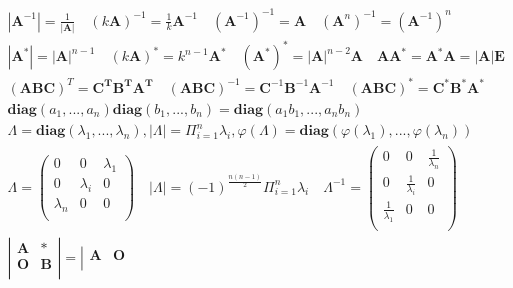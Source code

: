 \documentclass{article}
\begin{document}
\begin{align*}
    |\mathbf{A}^{-1}| = \frac{1}{|\mathbf{A}|} \quad (k\mathbf{A})^{-1} = \frac{1}{k}\mathbf{A}^{-1} \quad (\mathbf{A}^{-1})^{-1} = \mathbf{A} \quad (\mathbf{A}^{n})^{-1} = (\mathbf{A}^{-1})^{n}\\
    |\mathbf{A}^{*}| = |\mathbf{A}|^{n-1} \quad (k\mathbf{A})^{*} = k^{n-1}\mathbf{A}^{*} \quad (\mathbf{A}^{*})^{*} = |\mathbf{A}|^{n-2}\mathbf{A} \quad \mathbf{A}\mathbf{A}^{*} = \mathbf{A}^{*}\mathbf{A} = |\mathbf{A}|\mathbf{E}\\ 
    (\mathbf{A}\mathbf{B}\mathbf{C})^{T} = \mathbf{C}^{\mathbf{T}}\mathbf{B}^{\mathbf{T}}\mathbf{A}^{\mathbf{T}} \quad (\mathbf{A}\mathbf{B}\mathbf{C})^{-1} = \mathbf{C}^{-1}\mathbf{B}^{-1}\mathbf{A}^{-1} \quad (\mathbf{A}\mathbf{B}\mathbf{C})^{\mathbf{*}} = \mathbf{C}^{\mathbf{*}}\mathbf{B}^{\mathbf{*}}\mathbf{A}^{\mathbf{*}} \\ 
    \mathbf{diag}(a_{1},...,a_{n})\mathbf{diag}(b_{1},...,b_{n})=\mathbf{diag}(a_{1}b_{1},...,a_{n}b_{n}) \\ 
    \Lambda = \mathbf{diag}(\lambda_{1},...,\lambda_{n}),|\Lambda| = \Pi_{i=1}^{n} \lambda_{i},\varphi(\Lambda) = \mathbf{diag}(\varphi(\lambda_{1}),...,\varphi(\lambda_{n}))\\
    \Lambda = \left(
        \begin{array}{cccc}
            0 & 0 & \lambda_{1}\\
            0 & \lambda_{i} & 0 \\
            \lambda_{n} & 0 & 0\\
        \end{array}
    \right) \quad 
    |\Lambda| = (-1)^{\frac{n(n-1)}{2}}\Pi_{i=1}^{n}\lambda_{i} \quad \Lambda^{-1} = \left(
        \begin{array}{cccc}
            0 & 0 & \frac{1}{\lambda_{n}}\\
            0 & \frac{1}{\lambda_{i}} & 0 \\
            \frac{1}{\lambda_{1}} & 0 & 0\\
        \end{array}
    \right) \\ 
    \left|
        \begin{array}{ccc}
            \mathbf{A} & * \\ 
            \mathbf{O} & \mathbf{B} \\ 
        \end{array} 
    \right| = 
    \left|
        \begin{array}{ccc}
            \mathbf{A} & \mathbf{O} \\ 

\end{array}
\end{align*}
\end{document}
